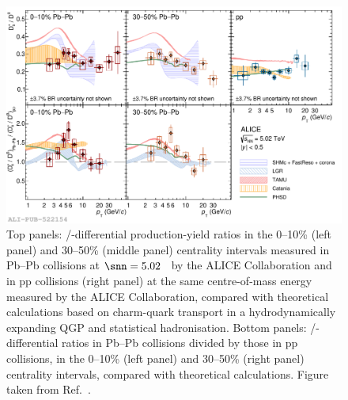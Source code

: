 \begin{figure}[htb]
    \centering
    \includegraphics[width=\textwidth]{Figures/Chapter 9/Ratio_and_DoubleRatio_DsOverD0_PbPb_pp_5TeV_vs_models_1.pdf}
    \caption{Top panels: \ds/\dz \pt-differential production-yield ratios in the 0--10\% (left panel) and 30--50\% (middle panel) centrality intervals measured in Pb--Pb collisions at \mbox{$\snn=5.02$~\tev} by the ALICE Collaboration and in pp collisions (right panel) at the same centre-of-mass energy measured by the ALICE Collaboration, compared with theoretical calculations based on charm-quark transport in a hydrodynamically expanding QGP and statistical hadronisation. Bottom panels: \ds/\dz \pt-differential ratios in Pb--Pb collisions divided by those in pp collisions, in the 0--10\% (left panel) and 30--50\% (right panel) centrality intervals, compared with theoretical calculations. Figure taken from Ref.~\cite{ALICE:2021npz}.}
    \label{fig:Double_ratio}
\end{figure}

